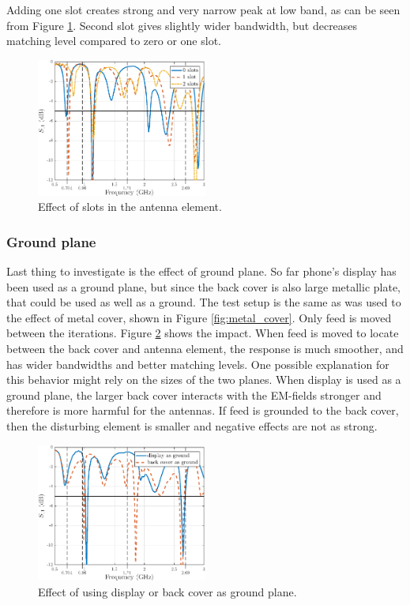 Adding one slot creates strong and very narrow peak at low band, as can be seen from Figure \ref{fig:slot_res}. Second slot gives slightly wider bandwidth, but decreases matching level compared to zero or one slot.

\begin{figure}[H]
    \centering
    \includegraphics[width=0.5\textwidth]{img/slot_res.eps}
    \caption{Effect of slots in the antenna element.}
    \label{fig:slot_res}
\end{figure}

\subsubsection{Ground plane}
\label{sec:ground_plane}
Last thing to investigate is the effect of ground plane. So far phone's display has been used as a ground plane, but since the back cover is also large metallic plate, that could be used as well as a ground. The test setup is the same as was used to the effect of metal cover, shown in Figure \ref{fig:metal_cover}. Only feed is moved between the iterations. Figure \ref{fig:ground_plane} shows the impact. When feed is moved to locate between the back cover and antenna element, the response is much smoother, and has wider bandwidths and better matching levels. One possible explanation for this behavior might rely on the sizes of the two planes. When display is used as a ground plane, the larger back cover interacts with the EM-fields stronger and therefore is more harmful for the antennas. If feed is grounded to the back cover, then the disturbing element is smaller and negative effects are not as strong.

\begin{figure}[H]
    \centering
    \includegraphics[width=0.5\textwidth]{img/ground_vs_display.eps}
    \caption{Effect of using display or back cover as ground plane.}
    \label{fig:ground_plane}
\end{figure}

